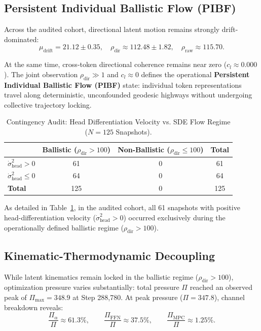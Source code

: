 \documentclass[11pt,twocolumn]{article}
\begin{document}
\subsection{Persistent Individual Ballistic Flow (PIBF)}
Across the audited cohort, directional latent motion remains strongly drift-dominated:
\begin{equation}
\mu_{\mathrm{drift}} = 21.12 \pm 0.35, \quad \rho_{\mathrm{dir}} \approx 112.48 \pm 1.82, \quad \rho_{\mathrm{raw}} \approx 115.70.
\end{equation}

At the same time, cross-token directional coherence remains near zero ($c_l \approx 0.000$). The joint observation $\rho_{\mathrm{dir}} \gg 1$ and $c_l \approx 0$ defines the operational \textbf{Persistent Individual Ballistic Flow (PIBF)} state: individual token representations travel along deterministic, unconfounded geodesic highways without undergoing collective trajectory locking.

\begin{table}[t]
\centering
\caption{Contingency Audit: Head Differentiation Velocity vs. SDE Flow Regime ($N=125$ Snapshots).}
\label{tab:contingency}
\small
\begin{tabular}{lccc}
\toprule
& \textbf{Ballistic ($\rho_{\mathrm{dir}} > 100$)} & \textbf{Non-Ballistic ($\rho_{\mathrm{dir}} \le 100$)} & \textbf{Total} \\
\midrule
$\dot{\sigma}^2_{\mathrm{head}} > 0$ & 61 & 0 & 61 \\
$\dot{\sigma}^2_{\mathrm{head}} \le 0$ & 64 & 0 & 64 \\
\midrule
\textbf{Total} & 125 & 0 & 125 \\
\bottomrule
\end{tabular}
\end{table}

As detailed in Table~\ref{tab:contingency}, in the audited cohort, all 61 snapshots with positive head-differentiation velocity ($\dot{\sigma}^2_{\mathrm{head}} > 0$) occurred exclusively during the operationally defined ballistic regime ($\rho_{\mathrm{dir}} > 100$).

\subsection{Kinematic-Thermodynamic Decoupling}
While latent kinematics remain locked in the ballistic regime ($\rho_{\mathrm{dir}} > 100$), optimization pressure varies substantially: total pressure $\Pi$ reached an observed peak of $\Pi_{\max} = 348.9$ at Step 288,780. At peak pressure ($\Pi = 347.8$), channel breakdown reveals:
\begin{equation}
\frac{\Pi_\alpha}{\Pi} \approx 61.3\%, \qquad \frac{\Pi_{\mathrm{FFN}}}{\Pi} \approx 37.5\%, \qquad \frac{\Pi_{\mathrm{MPC}}}{\Pi} \approx 1.25\%.
\end{equation}
\end{document}

